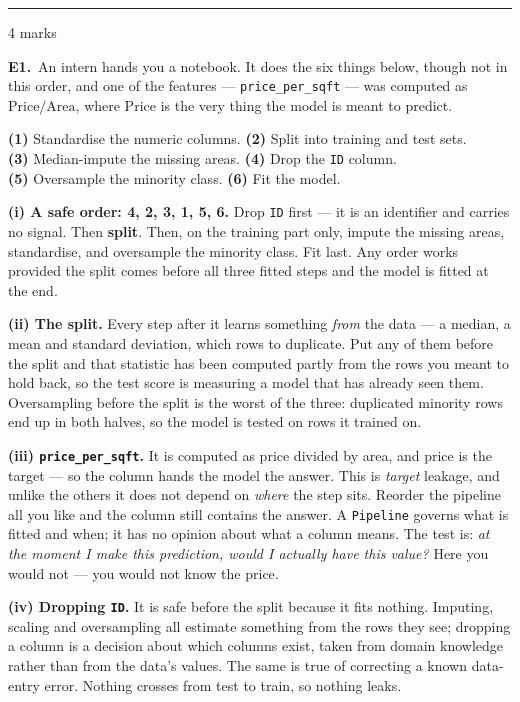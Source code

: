 \documentclass[10pt,a4paper]{article}
\newcommand{\parthead}[2]{\vspace{2pt}\noindent\rule{\linewidth}{0.4pt}\par\vspace{2pt}%
  \noindent{\bfseries Part #1}\hfill{\small #2}\par\vspace{1pt}}
\begin{document}
\newpage

\parthead{E --- Reasoning}{4 marks}

\textbf{E1.}\ An intern hands you a notebook. It does the six things below, though not in this order, and one of the
features --- \texttt{price\_per\_sqft} --- was computed as $\text{Price}/\text{Area}$, where $\text{Price}$
is the very thing the model is meant to predict.

\vspace{2mm}
\hspace*{4mm}\textbf{(1)} Standardise the numeric columns. \quad \textbf{(2)} Split into training and test sets.\\
\hspace*{4mm}\textbf{(3)} Median-impute the missing areas. \quad \textbf{(4)} Drop the \texttt{ID} column.\\
\hspace*{4mm}\textbf{(5)} Oversample the minority class. \quad \textbf{(6)} Fit the model.

\vspace{4pt}

\textbf{(i) A safe order: 4, 2, 3, 1, 5, 6.} Drop \texttt{ID} first --- it is an identifier and carries no signal. Then \textbf{split}. Then, on the training part only, impute the missing areas, standardise, and oversample the minority class. Fit last. Any order works provided the split comes before all three fitted steps and the model is fitted at the end.\par\vspace{1mm}\textbf{(ii) The split.} Every step after it learns something \emph{from} the data --- a median, a mean and standard deviation, which rows to duplicate. Put any of them before the split and that statistic has been computed partly from the rows you meant to hold back, so the test score is measuring a model that has already seen them. Oversampling before the split is the worst of the three: duplicated minority rows end up in both halves, so the model is tested on rows it trained on.\par\vspace{1mm}\textbf{(iii) \texttt{price\_per\_sqft}.} It is computed as price divided by area, and price is the target --- so the column hands the model the answer. This is \emph{target} leakage, and unlike the others it does not depend on \emph{where} the step sits. Reorder the pipeline all you like and the column still contains the answer. A \texttt{Pipeline} governs what is fitted and when; it has no opinion about what a column means. The test is: \emph{at the moment I make this prediction, would I actually have this value?} Here you would not --- you would not know the price.\par\vspace{1mm}\textbf{(iv) Dropping \texttt{ID}.} It is safe before the split because it fits nothing. Imputing, scaling and oversampling all estimate something from the rows they see; dropping a column is a decision about which columns exist, taken from domain knowledge rather than from the data's values. The same is true of correcting a known data-entry error. Nothing crosses from test to train, so nothing leaks.
\end{document}

